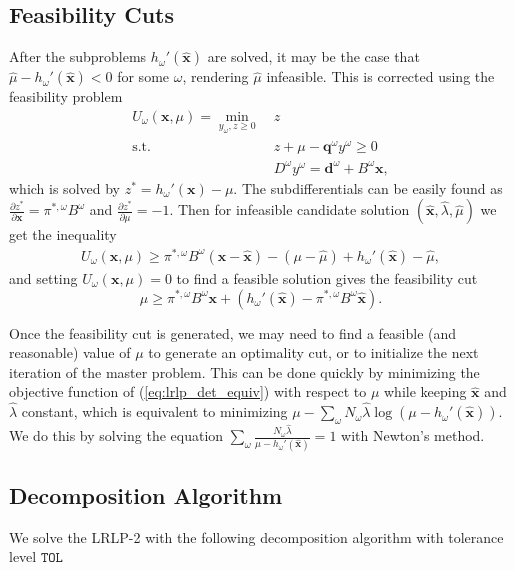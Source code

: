 \documentclass[11pt]{article}
\newcommand{\x}{\mathbf{x}}
\newcommand{\xh}{\hat{\x}}
\newcommand{\lh}{\hat{\lambda}}
\newcommand{\mh}{\hat{\mu}}
\newcommand{\q}{\mathbf{q}}
\renewcommand{\d}{\mathbf{d}}
\newcommand{\st}{\mbox{s.t.}}
\begin{document}
\subsection{Feasibility Cuts}
After the subproblems $h_\omega'(\xh)$ are solved, it may be the case that $\mh - h_\omega'(\xh) < 0$ for some $\omega$, rendering $\mh$ infeasible.  This is corrected using the feasibility problem
\begin{align*}
	U_\omega(\x,\mu) = \min_{y_\omega,z \geq 0} \ & z \\
	\st \ & z + \mu - \q^\omega y^\omega \geq 0 \\
	& D^\omega y^\omega = \d^\omega + B^\omega \x,
\end{align*}
which is solved by $z^* = h_\omega'(\x) - \mu$.  The subdifferentials can be easily found as $\frac{\partial z^*}{\partial \x} = \pi^{*,\omega} B^\omega$ and $\frac{\partial z^*}{\partial \mu} = -1$.  Then for infeasible candidate solution $(\xh,\lh,\mh)$ we get the inequality
\begin{align*}
	U_\omega(\x,\mu) \geq \pi^{*,\omega}B^\omega(\x-\xh) - (\mu -\mh) + h_\omega'(\xh) - \mh,
\end{align*}
and setting $U_\omega(\x,\mu) = 0$ to find a feasible solution gives the feasibility cut
\[
	\mu \geq \pi^{*,\omega}B^\omega \x + (h_\omega'(\xh) - \pi^{*,\omega}B^\omega\xh).
\]

Once the feasibility cut is generated, we may need to find a feasible (and reasonable) value of $\mu$ to generate an optimality cut, or to initialize the next iteration of the master problem.  This can be done quickly by minimizing the objective function of (\ref{eq:lrlp_det_equiv}) with respect to $\mu$ while keeping $\xh$ and $\lh$ constant, which is equivalent to minimizing $\mu - \sum_\omega N_\omega \lh \log(\mu - h_\omega'(\xh))$.  We do this by solving the equation $\sum_\omega \frac{N_\omega \lh}{\mu - h_\omega'(\xh)} = 1$ with Newton's method.

\subsection{Decomposition Algorithm}

We solve the LRLP-2 with the following decomposition algorithm with tolerance level $\texttt{TOL}$
\end{document}
